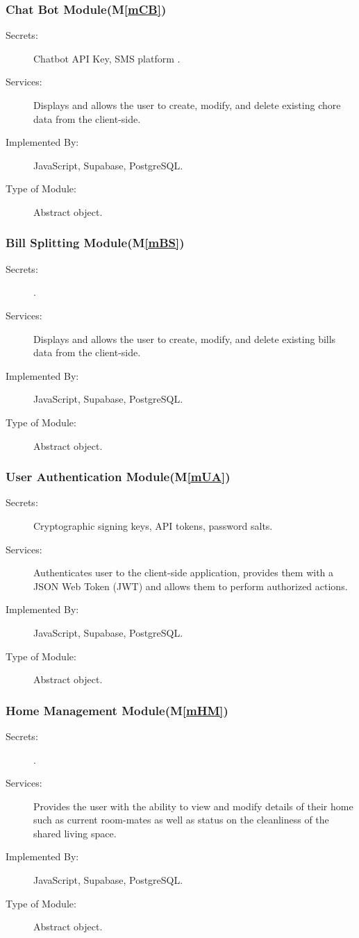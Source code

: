 \documentclass[12pt, titlepage]{article}
\newcommand{\mref}[1]{M\ref{#1}}
\begin{document}
\subsubsection{Chat Bot Module(\mref{mCB})}
\begin{description}
\item[Secrets:]Chatbot API Key, SMS platform .
\item[Services:] Displays and allows the user to create, modify, and delete existing chore data from the client-side.
\item[Implemented By:] JavaScript, Supabase, PostgreSQL.
\item[Type of Module:] Abstract object.
\end{description}

\subsubsection{Bill Splitting Module(\mref{mBS})}
\begin{description}
\item[Secrets:].
\item[Services:] Displays and allows the user to create, modify, and delete existing bills data from the client-side.
\item[Implemented By:] JavaScript, Supabase, PostgreSQL.
\item[Type of Module:] Abstract object.
\end{description}

\subsubsection{User Authentication Module(\mref{mUA})}
\begin{description}
\item[Secrets:] Cryptographic signing keys, API tokens, password salts.
\item[Services:] Authenticates user to the client-side application, provides them with a JSON Web Token (JWT) and allows them to perform authorized actions.
\item[Implemented By:] JavaScript, Supabase, PostgreSQL.
\item[Type of Module:] Abstract object.
\end{description}

\subsubsection{Home Management Module(\mref{mHM})}
\begin{description}
\item[Secrets:] .
\item[Services:] Provides the user with the ability to view and modify details of their home such as current room-mates as well as status on the cleanliness of the shared living space. 
\item[Implemented By:] JavaScript, Supabase, PostgreSQL.
\item[Type of Module:] Abstract object.
\end{description}
\end{document}
